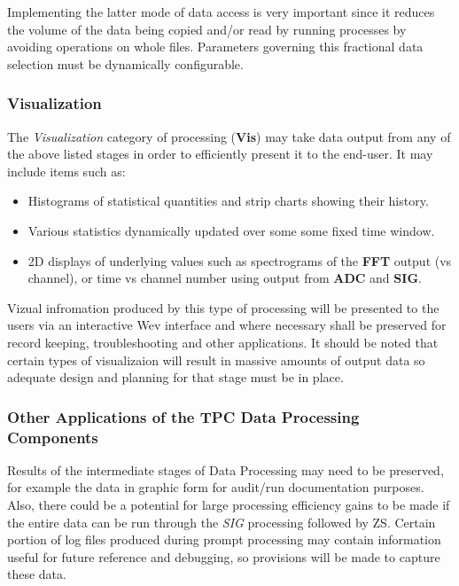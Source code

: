 \documentclass[pdftex,12pt,letter]{article}
\begin{document}
\noindent Implementing the latter mode of data access is very important since it reduces
the volume of the data being copied and/or read by running processes by avoiding
operations on whole files.
Parameters governing this fractional data selection must be dynamically configurable.


\subsubsection{Visualization}
\label{sec:viz_intro}

The \textit{Visualization} category of processing (\textbf{Vis})
 may take data output from any of the above listed stages in
order to efficiently present it to the end-user. 
It may include items such as:

\begin{itemize}

\item Histograms of statistical quantities and strip charts showing their history.

\item Various statistics dynamically updated over some some fixed time window.

\item 2D displays of underlying values such as spectrograms of the \textbf{FFT}
  output (vs channel), or time vs channel number using output from \textbf{ADC} and \textbf{SIG}.

\end{itemize}

\noindent Vizual infromation produced by this type of processing will be presented to the users
via an interactive Wev interface and where necessary shall be preserved for record keeping,
troubleshooting and other applications. It should be noted that certain types of visualizaion
will result in massive amounts of output data so adequate design and planning for that stage
must be in place.

\subsubsection{Other Applications of the TPC Data Processing Components}
Results of the intermediate stages of Data Processing may need to be preserved, for
example the data in graphic form for audit/run documentation purposes.
Also, there could be a potential for large processing efficiency
gains to be made if the entire data can be run through the \textit{SIG} processing followed by ZS.
Certain portion of log files produced during prompt processing may contain information useful
for future reference and debugging, so provisions will be made to capture these data.
\end{document}
